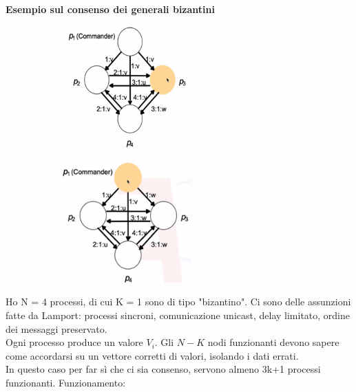 \documentclass[12pt,italian]{report}
\begin{document}
\bigbreak
\noindent \textbf{Esempio sul consenso dei generali bizantini} 
\bigbreak
\begin{figure}[h]
     \centering
     \begin{subfigure}[b]{0.3\textwidth}
         \centering
         \includegraphics[width=50mm]{img/biz1.png}
     \end{subfigure}
     \hfill
     \begin{subfigure}[b]{0.5\textwidth}
         \centering
          \includegraphics[width=50mm]{img/biz2.png}
     \end{subfigure}
\end{figure}
\noindent Ho N = 4 processi, di cui K = 1 sono di tipo "bizantino". Ci sono delle assunzioni fatte da Lamport: processi sincroni, comunicazione unicast, delay limitato, ordine dei messaggi preservato. \\ Ogni processo produce un valore $V_i$. Gli $N-K$ nodi funzionanti devono sapere come accordarsi su un vettore corretti di valori, isolando i dati errati. \\ In questo caso per far sì che ci sia consenso, servono almeno 3k+1 processi funzionanti. 
\bigbreak
\noindent Funzionamento: 
\end{document}
